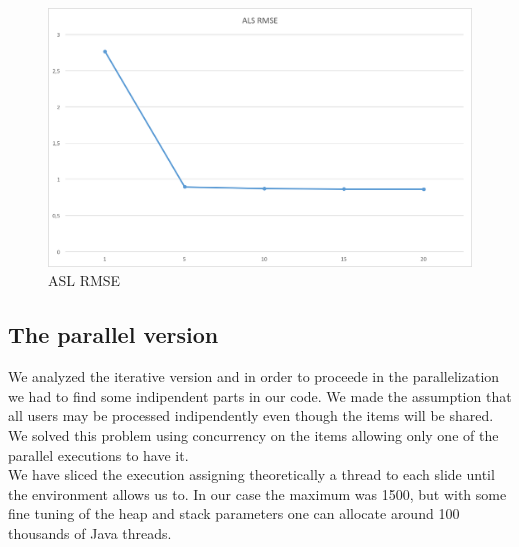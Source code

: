 \documentclass{sig-alternate-05-2015}
\begin{document}
\begin{figure}
    \caption{ASL RMSE}
    \centering
    \includegraphics[scale=0.4]{alsrmse.png}
\end{figure}

\subsection{The parallel version}
We analyzed the iterative version and in order to proceede in the parallelization
we had to find some indipendent parts in our code. We made the assumption
that all users may be processed indipendently even though the items will be shared.
We solved this problem using concurrency on the items allowing only one of the
parallel executions to have it. \\
We have sliced the execution assigning theoretically a thread to each slide
until the environment allows us to. In our case the maximum was 1500, but with
some fine tuning of the heap and stack parameters one can allocate around 100 thousands
of Java threads.\cite{stack}\\
\end{document}
